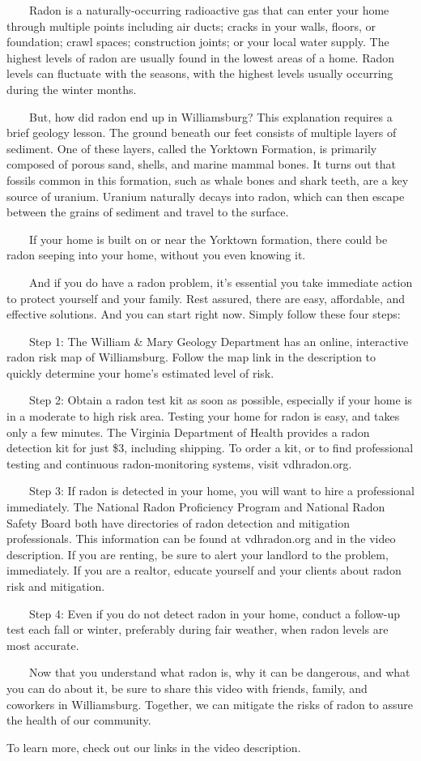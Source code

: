 \documentclass[
]{article}
\begin{document}
~~~~Radon is a naturally-occurring radioactive gas that can enter your home
through multiple points including air ducts; cracks in your walls,
floors, or foundation; crawl spaces; construction joints; or your local
water supply. The highest levels of radon are usually found in the
lowest areas of a home. Radon levels can fluctuate with the seasons,
with the highest levels usually occurring during the winter months.

~~~~But, how did radon end up in Williamsburg? This explanation requires a
brief geology lesson. The ground beneath our feet consists of multiple
layers of sediment. One of these layers, called the Yorktown Formation,
is primarily composed of porous sand, shells, and marine mammal bones.
It turns out that fossils common in this formation, such as whale bones
and shark teeth, are a key source of uranium. Uranium naturally decays
into radon, which can then escape between the grains of sediment and
travel to the surface.

~~~~If your home is built on or near the Yorktown formation, there could be
radon seeping into your home, without you even knowing it.

~~~~And if you do have a radon problem, it's essential you take immediate
action to protect yourself and your family. Rest assured, there are
easy, affordable, and effective solutions. And you can start right now.
Simply follow these four steps:

~~~~Step 1: The William \& Mary Geology Department has an online,
interactive radon risk map of Williamsburg. Follow the map link in the
description to quickly determine your home's estimated level of risk.

~~~~Step 2: Obtain a radon test kit as soon as possible, especially if
your home is in a moderate to high risk area. Testing your home for
radon is easy, and takes only a few minutes. The Virginia Department of
Health provides a radon detection kit for just \$3, including shipping.
To order a kit, or to find professional testing and continuous
radon-monitoring systems, visit vdhradon.org.

~~~~Step 3: If radon is detected in your home, you will want to hire a
professional immediately. The National Radon Proficiency Program and
National Radon Safety Board both have directories of radon detection and
mitigation professionals. This information can be found at vdhradon.org
and in the video description. If you are renting, be sure to alert your
landlord to the problem, immediately. If you are a realtor, educate
yourself and your clients about radon risk and mitigation.

~~~~Step 4: Even if you do not detect radon in your home, conduct a
follow-up test each fall or winter, preferably during fair weather, when
radon levels are most accurate.

~~~~Now that you understand what radon is, why it can be dangerous, and what
you can do about it, be sure to share this video with friends, family,
and coworkers in Williamsburg. Together, we can mitigate the risks of
radon to assure the health of our community.

To learn more, check out our links in the video description.
\end{document}
